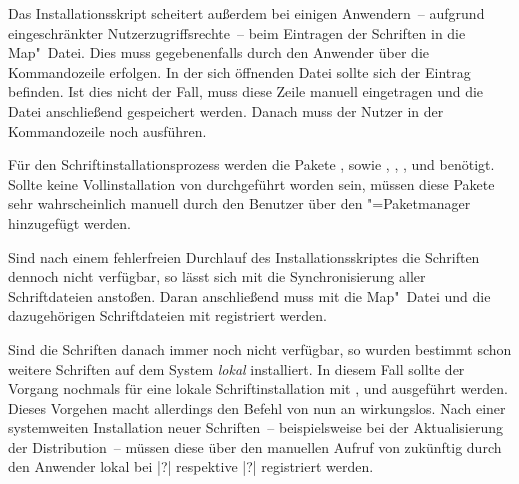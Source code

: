 Das Installationsskript scheitert außerdem bei einigen Anwendern~-- aufgrund 
eingeschränkter Nutzerzugriffsrechte~-- beim Eintragen der Schriften in die 
Map"~Datei. Dies muss gegebenenfalls durch den Anwender über die Kommandozeile 
 erfolgen. In der sich öffnenden 
Datei sollte sich der Eintrag  befinden. Ist dies nicht 
der Fall, muss diese Zeile manuell eingetragen und die Datei anschließend 
gespeichert werden. Danach muss der Nutzer in der Kommandozeile noch 
 ausführen.


Für den Schriftinstallationsprozess werden die Pakete , 
 sowie , , 
,  und  benötigt. Sollte 
keine Vollinstallation von  durchgeführt worden 
sein, müssen diese Pakete sehr wahrscheinlich manuell durch den Benutzer über 
den "=Paketmanager hinzugefügt werden.

Sind nach einem fehlerfreien Durchlauf des Installationsskriptes die Schriften 
dennoch nicht verfügbar, so lässt sich mit  
die Synchronisierung aller Schriftdateien anstoßen. Daran anschließend muss mit 
 die Map"~Datei und die dazugehörigen
Schriftdateien mit  registriert werden.

Sind die Schriften danach immer noch nicht verfügbar, so wurden bestimmt schon 
weitere Schriften auf dem System \emph{lokal} installiert. In diesem Fall 
sollte der Vorgang nochmals für eine lokale Schriftinstallation mit 
,  und 
 ausgeführt werden. Dieses Vorgehen macht allerdings den 
Befehl  von nun an wirkungslos. Nach einer systemweiten 
Installation neuer Schriften~-- beispielsweise bei der Aktualisierung der 
Distribution~-- müssen diese über den manuellen Aufruf von  
zukünftig durch den Anwender lokal bei |?| 
respektive |?| registriert werden.



